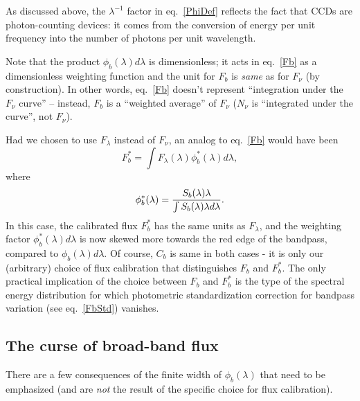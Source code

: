 \documentclass{emulateapj}
\begin{document}
As discussed above, the $\lambda^{-1}$ factor in eq.~\ref{PhiDef} reflects the fact that CCDs are 
photon-counting devices: it comes from the conversion of energy per unit frequency
into the number of photons per unit wavelength. 

Note that the product $\phi_b(\lambda) d\lambda$ is dimensionless; it acts in eq.~\ref{Fb} as a 
dimensionless weighting function and the unit for $F_b$ is {\it same} as for $F_\nu$
(by construction).  In other words, eq.~\ref{Fb} doesn't represent ``integration under the 
$F_\nu$ curve'' -- instead, $F_b$ is a ``weighted average'' of $F_\nu$ ($N_\nu$ is 
``integrated under the curve'', not $F_\nu$). 

Had we chosen to use $F_\lambda$ instead of $F_\nu$, an analog
to eq.~\ref{Fb} would have been 
\begin{equation}
\label{FbL}
              F_b^\ast = \int{F_\lambda(\lambda) \phi^\ast_b(\lambda) d\lambda},
\end{equation}
where
\begin{equation}
\label{PhiL}
\phi^\ast_b(\lambda) = {S_b(\lambda) \lambda \over \int{S_b(\lambda) \lambda d\lambda}}.
\end{equation}
In this case, the calibrated flux $F_b^\ast$ has the same units as $F_\lambda$, and
the weighting factor $\phi^\ast_b(\lambda) d\lambda$ is now skewed more towards 
the red edge of the bandpass, compared to $\phi_b(\lambda) d\lambda$. Of course, 
$C_b$ is same in both cases - it is only our (arbitrary) choice of flux calibration that 
distinguishes $F_b$  and $F_b^\ast$. The only practical implication of the choice between 
$F_b$  and $F_b^\ast$ is the type of the spectral energy distribution for which photometric 
standardization correction for bandpass variation (see eq.~\ref{FbStd}) vanishes.  


\subsection{The curse of broad-band flux} 

There are a few consequences of the finite width of $\phi_b(\lambda)$ that need to be 
emphasized (and are {\it not} the result of the specific choice for flux calibration). 
\end{document}
